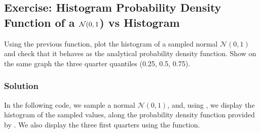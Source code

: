 \documentclass[letterpaper,10pt,english]{jupyterBook}
\begin{document}
\subsection{Exercise: Histogram \sphinxhyphen{} Probability Density Function of a \protect\(\mathcal N(0,1\protect\)) vs Histogram}
\label{\detokenize{01:exercise-histogram-probability-density-function-of-a-mathcal-n-0-1-vs-histogram}}
\sphinxAtStartPar
Using the previous  function, plot the histogram of a sampled normal \(\mathcal{N}(0, 1)\) and check that it behaves as the analytical probability density function. Show on the same graph the three quarter quantiles (0.25, 0.5, 0.75).


\subsubsection{Solution}
\label{\detokenize{01:solution}}
\sphinxAtStartPar
In the following code, we sample a normal \(\mathcal{N}(0, 1)\), and, using , we display the histogram of the sampled values, along the probability density function provided by . We also display the three first quarters using the  function.
\end{document}
